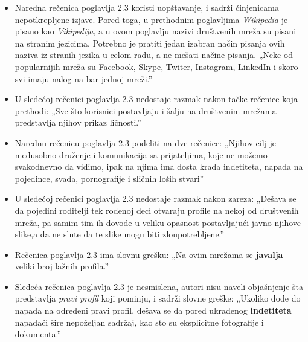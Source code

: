 \documentclass[a4paper]{report}
\begin{document}
\begin{itemize}
    \item Naredna rečenica poglavlja 2.3 koristi uopštavanje, i sadrži činjenicama nepotkrepljene izjave. Pored toga, u prethodnim poglavljima \textit{Wikipedia} je pisano kao \textit{Vikipedija}, a u ovom poglavlju nazivi društvenih mreža su pisani na stranim jezicima. Potrebno je pratiti jedan izabran način pisanja ovih naziva iz stranih jezika u celom radu, a ne mešati načine pisanja. \newline
    „Neke od popularnijih mreža su Facebook, Skype, Twiter, Instagram, LinkedIn i skoro svi imaju nalog na bar jednoj mreži.”
\end{itemize}
\begin{itemize}
    \item U sledećoj rečenici poglavlja 2.3 nedostaje razmak nakon tačke rečenice koja prethodi:\newline
    „Sve što korisnici postavljaju i šalju na društvenim mrežama predstavlja njihov prikaz ličnosti.”
\end{itemize}
\begin{itemize}
    \item Narednu rečenicu poglavlja 2.3 podeliti na dve rečenice:\newline
    „Njihov cilj je medusobno druženje i komunikacija sa prijateljima, koje ne možemo svakodnevno da vidimo, ipak na njima ima dosta krada indetiteta, napada na pojedince, svada, pornografije i sličnih loših stvari”
\end{itemize}
\begin{itemize}
    \item U sledećoj rečenici poglavlja 2.3 nedostaje razmak nakon zareza:\newline
    „Dešava se da pojedini roditelji tek rodenoj deci otvaraju profile na nekoj od društvenih mreža, pa samim tim ih dovode u veliku opasnost postavljajući javno njihove slike,a da ne slute da te slike mogu biti zloupotrebljene.”
\end{itemize}
\begin{itemize}
    \item Rečenica poglavlja 2.3 ima slovnu grešku: \newline
    „Na ovim mrežama se \textbf{javalja} veliki broj lažnih profila.”
\end{itemize}
\begin{itemize}
    \item Sledeća rečenica poglavlja 2.3 je nesmislena, autori nisu naveli objašnjenje šta predstavlja \textit{pravi profil} koji pominju, i sadrži slovne greške:\newline
    „Ukoliko dode do napada na odredeni pravi profil, dešava se da pored ukradenog \textbf{indetiteta} napadači šire nepoželjan sadržaj, kao sto su eksplicitne fotografije i dokumenta.”
\end{itemize}
\end{document}
